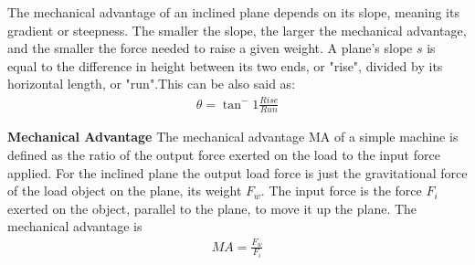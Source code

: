\begin{phybox}{}
{The mechanical advantage of an inclined plane depends on its slope, meaning its gradient or steepness. The smaller the slope, the larger the mechanical advantage, and the smaller the force needed to raise a given weight. A plane's slope $s$ is equal to the difference in height between its two ends, or "rise", divided by its horizontal length, or "run".This can be also said as:
\begin{align*}
  \theta = \tan^-1 \frac{Rise}{Run}  
\end{align*}

\textbf{Mechanical Advantage}
The mechanical advantage MA of a simple machine is defined as the ratio of the output force exerted on the load to the input force applied. For the inclined plane the output load force is just the gravitational force of the load object on the plane, its weight $F_w$. The input force is the force $F_i$ exerted on the object, parallel to the plane, to move it up the plane. The mechanical advantage is
\begin{align*}
    MA= \frac{F_w}{F_i}
\end{align*}}
\end{phybox}
